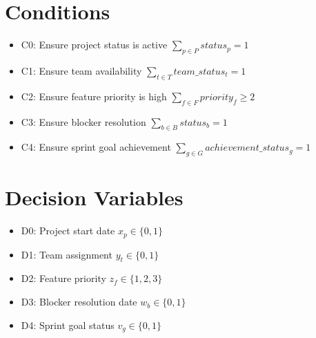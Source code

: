 \documentclass{article}
\begin{document}
\section{Conditions}
\begin{itemize}
    \item C0: Ensure project status is active $\sum_{p \in P} status_p = 1$
    \item C1: Ensure team availability $\sum_{t \in T} team\_status_t = 1$
    \item C2: Ensure feature priority is high $\sum_{f \in F} priority_f \geq 2$
    \item C3: Ensure blocker resolution $\sum_{b \in B} status_b = 1$
    \item C4: Ensure sprint goal achievement $\sum_{g \in G} achievement\_status_g = 1$
\end{itemize}

\section{Decision Variables}
\begin{itemize}
    \item D0: Project start date $x_{p} \in \{0,1\}$
    \item D1: Team assignment $y_{t} \in \{0,1\}$
    \item D2: Feature priority $z_{f} \in \{1,2,3\}$
    \item D3: Blocker resolution date $w_{b} \in \{0,1\}$
    \item D4: Sprint goal status $v_{g} \in \{0,1\}$
\end{itemize}
\end{document}
